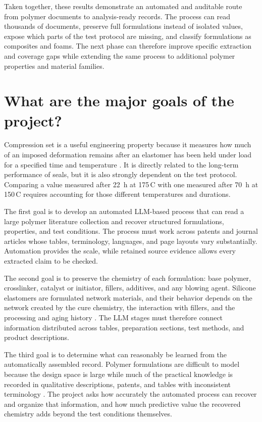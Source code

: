 \documentclass[10pt]{article}
\newcommand{\degC}{\,\textdegree C}
\begin{document}
Taken together, these results demonstrate an automated and auditable route from
polymer documents to analysis-ready records. The process can read thousands of
documents, preserve full formulations instead of isolated values, expose which
parts of the test protocol are missing, and classify formulations as composites
and foams. The next phase can therefore improve specific extraction and coverage
gaps while extending the same process to additional polymer properties and
material families.

\section{What are the major goals of the project?}
Compression set is a useful engineering property because it measures how much
of an imposed deformation remains after an elastomer has been held under load
for a specified time and temperature \citep{astmd395}. It is directly related
to the long-term performance of seals, but it is also strongly dependent on
the test protocol. Comparing a value measured after 22~h at 175\degC{} with
one measured after 70~h at 150\degC{} requires accounting for those different
temperatures and durations.

The first goal is to develop an automated LLM-based process that can read a
large polymer literature collection and recover structured formulations,
properties, and test conditions. The process must work across patents and
journal articles whose tables, terminology, languages, and page layouts vary
substantially. Automation provides the scale, while retained source evidence
allows every extracted claim to be checked.

The second goal is to preserve the chemistry of each formulation: base polymer,
crosslinker, catalyst or initiator, fillers, additives, and any blowing agent.
Silicone elastomers are formulated network materials, and their behavior
depends on the network created by the cure chemistry, the interaction with
fillers, and the processing and aging history
\citep{mazurek2019silicone,yue2013tensile,patel2004stress}. The LLM stages must
therefore connect information distributed across tables, preparation sections,
test methods, and product descriptions.

The third goal is to determine what can reasonably be learned from the
automatically assembled record. Polymer formulations are difficult to model
because the design space is large while much of the practical knowledge is
recorded in qualitative descriptions, patents, and tables with inconsistent
terminology \citep{audus2017polymer,butler2018machine,ramprasad2017machine}.
The project asks how accurately the automated process can recover and organize
that information, and how much predictive value the recovered chemistry adds
beyond the test conditions themselves.
\end{document}
